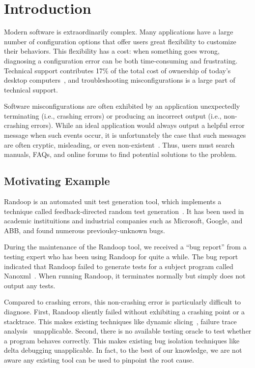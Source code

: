 
\section{Introduction}
\label{sec:introduction}

Modern software is extraordinarily complex. Many applications have a large
number of configuration options that offer users great flexibility to
customize their behaviors. This flexibility has a cost: when something
goes wrong, diagnosing a configuration error can be both time-consuming
and frustrating. Technical support contributes 17\% of the total cost of ownership of
today's desktop computers~\cite{confevidence}, and troubleshooting misconfigurations
is a large part of technical support.

Software misconfigurations are often exhibited by an application unexpectedly terminating
(i.e., crashing errors) or producing an incorrect output (i.e., non-crashing errors). While an ideal application would always
output a helpful error message when such events occur, it is unfortunately
the case that such messages are often cryptic, misleading, or
even non-existent~\cite{Yin:2011:ESC, Attariyan:2010:ACT, Hubaux:2012, rangefix}.
Thus, users must search manuals, FAQs, and online forums to find potential
solutions to the problem. %

\subsection{Motivating Example}

Randoop is an automated unit test generation tool, which implements
a technique called feedback-directed random test generation~\cite{randoop}.
It has been used in academic instituitions and
industrial companies such as Microsoft, Google,
and ABB, and found numerous previoulsy-unknown bugs.

During the maintenance of the Randoop tool, we received a ``bug report''
from a testing expert who has been using Randoop for quite a while.
The bug report indicated that Randoop failed to generate
tests for a subject program called Nanoxml~\cite{nanoxml}. When running Randoop,
it terminates normally but simply does not output any tests.

Compared to crashing errors, this non-crashing error is particularly difficult to diagnose.
First, Randoop sliently failed without exhibiting a crashing point or
a stacktrace. This makes existing techniques like dynamic slicing~\cite{Zhang:2003:PDS},
failure trace analysis~\cite{Rabkin:2011:PPC, Attariyan:2010:ACT} unapplicable. Second, there is no
available testing oracle to test whether a program behaves correctly.
This makes existing bug isolation techniques like delta debugging
unapplicable. In fact, to the best of our knowledge, we are not
aware any existing tool can be used to pinpoint the root cause.

